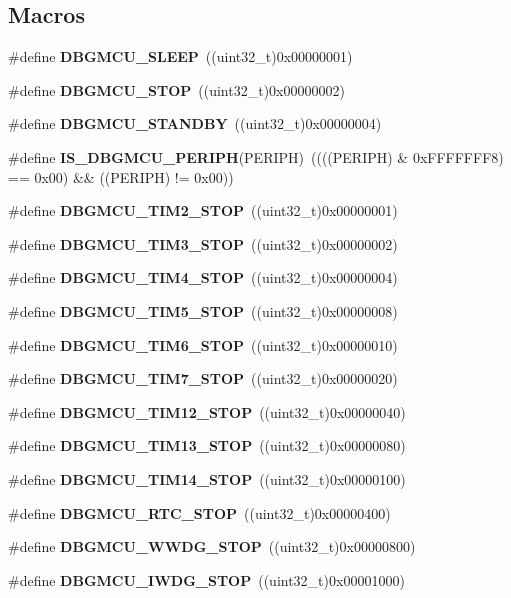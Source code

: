 \subsection*{Macros}
\begin{DoxyCompactItemize}
\item 
\#define \textbf{ D\+B\+G\+M\+C\+U\+\_\+\+S\+L\+E\+EP}~((uint32\+\_\+t)0x00000001)
\item 
\#define \textbf{ D\+B\+G\+M\+C\+U\+\_\+\+S\+T\+OP}~((uint32\+\_\+t)0x00000002)
\item 
\#define \textbf{ D\+B\+G\+M\+C\+U\+\_\+\+S\+T\+A\+N\+D\+BY}~((uint32\+\_\+t)0x00000004)
\item 
\#define \textbf{ I\+S\+\_\+\+D\+B\+G\+M\+C\+U\+\_\+\+P\+E\+R\+I\+PH}(P\+E\+R\+I\+PH)~((((P\+E\+R\+I\+PH) \& 0x\+F\+F\+F\+F\+F\+F\+F8) == 0x00) \&\& ((\+P\+E\+R\+I\+P\+H) != 0x00))
\item 
\#define \textbf{ D\+B\+G\+M\+C\+U\+\_\+\+T\+I\+M2\+\_\+\+S\+T\+OP}~((uint32\+\_\+t)0x00000001)
\item 
\#define \textbf{ D\+B\+G\+M\+C\+U\+\_\+\+T\+I\+M3\+\_\+\+S\+T\+OP}~((uint32\+\_\+t)0x00000002)
\item 
\#define \textbf{ D\+B\+G\+M\+C\+U\+\_\+\+T\+I\+M4\+\_\+\+S\+T\+OP}~((uint32\+\_\+t)0x00000004)
\item 
\#define \textbf{ D\+B\+G\+M\+C\+U\+\_\+\+T\+I\+M5\+\_\+\+S\+T\+OP}~((uint32\+\_\+t)0x00000008)
\item 
\#define \textbf{ D\+B\+G\+M\+C\+U\+\_\+\+T\+I\+M6\+\_\+\+S\+T\+OP}~((uint32\+\_\+t)0x00000010)
\item 
\#define \textbf{ D\+B\+G\+M\+C\+U\+\_\+\+T\+I\+M7\+\_\+\+S\+T\+OP}~((uint32\+\_\+t)0x00000020)
\item 
\#define \textbf{ D\+B\+G\+M\+C\+U\+\_\+\+T\+I\+M12\+\_\+\+S\+T\+OP}~((uint32\+\_\+t)0x00000040)
\item 
\#define \textbf{ D\+B\+G\+M\+C\+U\+\_\+\+T\+I\+M13\+\_\+\+S\+T\+OP}~((uint32\+\_\+t)0x00000080)
\item 
\#define \textbf{ D\+B\+G\+M\+C\+U\+\_\+\+T\+I\+M14\+\_\+\+S\+T\+OP}~((uint32\+\_\+t)0x00000100)
\item 
\#define \textbf{ D\+B\+G\+M\+C\+U\+\_\+\+R\+T\+C\+\_\+\+S\+T\+OP}~((uint32\+\_\+t)0x00000400)
\item 
\#define \textbf{ D\+B\+G\+M\+C\+U\+\_\+\+W\+W\+D\+G\+\_\+\+S\+T\+OP}~((uint32\+\_\+t)0x00000800)
\item 
\#define \textbf{ D\+B\+G\+M\+C\+U\+\_\+\+I\+W\+D\+G\+\_\+\+S\+T\+OP}~((uint32\+\_\+t)0x00001000)
\item 

\end{DoxyCompactItemize}
